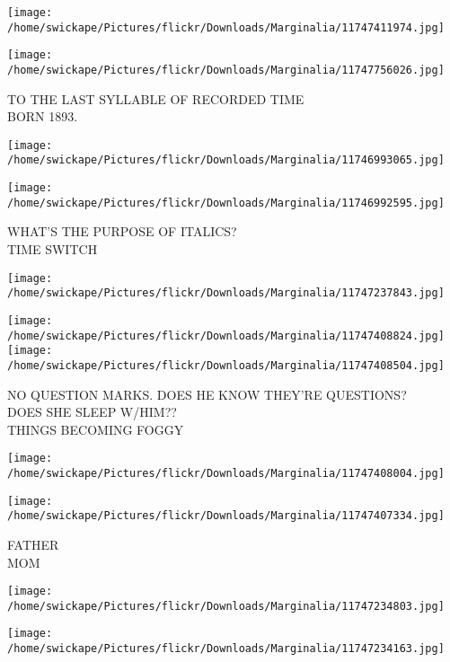\documentclass[10pt,letterpaper]{article}
\begin{document}
\texttt{[image: /home/swickape/Pictures/flickr/Downloads/Marginalia/11747411974.jpg]}

\vspace{0.25in}
\texttt{[image: /home/swickape/Pictures/flickr/Downloads/Marginalia/11747756026.jpg]}

TO THE LAST SYLLABLE OF RECORDED TIME\\
BORN 1893.\\
\pagebreak

\texttt{[image: /home/swickape/Pictures/flickr/Downloads/Marginalia/11746993065.jpg]}

\vspace{0.25in}
\texttt{[image: /home/swickape/Pictures/flickr/Downloads/Marginalia/11746992595.jpg]}

WHAT'S THE PURPOSE OF ITALICS?\\
TIME SWITCH\\
\pagebreak

\texttt{[image: /home/swickape/Pictures/flickr/Downloads/Marginalia/11747237843.jpg]}

\vspace{0.25in}
\texttt{[image: /home/swickape/Pictures/flickr/Downloads/Marginalia/11747408824.jpg]}
\texttt{[image: /home/swickape/Pictures/flickr/Downloads/Marginalia/11747408504.jpg]}

NO QUESTION MARKS.  DOES HE KNOW THEY'RE QUESTIONS?\\
DOES SHE SLEEP W/HIM??\\
THINGS BECOMING FOGGY\\
\pagebreak

\texttt{[image: /home/swickape/Pictures/flickr/Downloads/Marginalia/11747408004.jpg]}

\vspace{0.25in}
\texttt{[image: /home/swickape/Pictures/flickr/Downloads/Marginalia/11747407334.jpg]}

FATHER\\
MOM\\
\pagebreak

\texttt{[image: /home/swickape/Pictures/flickr/Downloads/Marginalia/11747234803.jpg]}

\vspace{0.25in}
\texttt{[image: /home/swickape/Pictures/flickr/Downloads/Marginalia/11747234163.jpg]}
\end{document}
